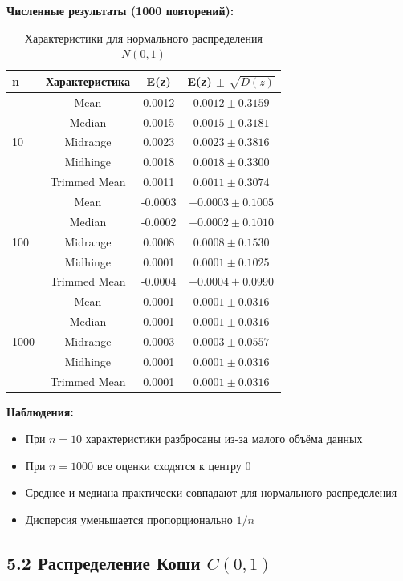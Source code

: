 \documentclass[a4paper,14pt]{extarticle}
\begin{document}
\textbf{Численные результаты (1000 повторений):}

\begin{table}[H]
\centering
\caption{Характеристики для нормального распределения $N(0, 1)$}
\begin{tabular}{|l|c|c|c|}
\hline
\textbf{n} & \textbf{Характеристика} & \textbf{E(z)} & \textbf{E(z) $\pm$ $\sqrt{D(z)}$} \\
\hline
\multirow{5}{*}{10} 
& Mean & 0.0012 & $0.0012 \pm 0.3159$ \\
& Median & 0.0015 & $0.0015 \pm 0.3181$ \\
& Midrange & 0.0023 & $0.0023 \pm 0.3816$ \\
& Midhinge & 0.0018 & $0.0018 \pm 0.3300$ \\
& Trimmed Mean & 0.0011 & $0.0011 \pm 0.3074$ \\
\hline
\multirow{5}{*}{100} 
& Mean & -0.0003 & $-0.0003 \pm 0.1005$ \\
& Median & -0.0002 & $-0.0002 \pm 0.1010$ \\
& Midrange & 0.0008 & $0.0008 \pm 0.1530$ \\
& Midhinge & 0.0001 & $0.0001 \pm 0.1025$ \\
& Trimmed Mean & -0.0004 & $-0.0004 \pm 0.0990$ \\
\hline
\multirow{5}{*}{1000} 
& Mean & 0.0001 & $0.0001 \pm 0.0316$ \\
& Median & 0.0001 & $0.0001 \pm 0.0316$ \\
& Midrange & 0.0003 & $0.0003 \pm 0.0557$ \\
& Midhinge & 0.0001 & $0.0001 \pm 0.0316$ \\
& Trimmed Mean & 0.0001 & $0.0001 \pm 0.0316$ \\
\hline
\end{tabular}
\end{table}

\textbf{Наблюдения:}
\begin{itemize}
    \item При $n=10$ характеристики разбросаны из-за малого объёма данных
    \item При $n=1000$ все оценки сходятся к центру $0$
    \item Среднее и медиана практически совпадают для нормального распределения
    \item Дисперсия уменьшается пропорционально $1/n$
\end{itemize}

\subsection*{5.2 Распределение Коши $C(0, 1)$}
\end{document}
